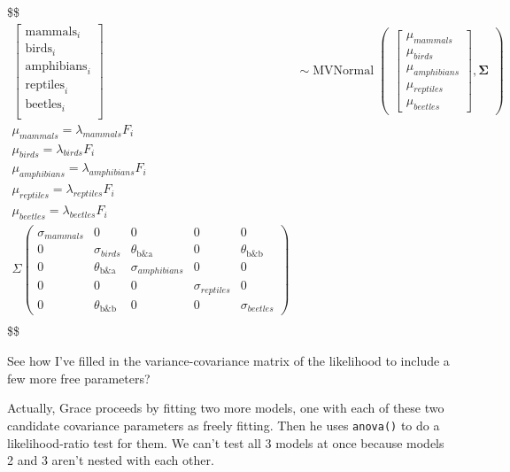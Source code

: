 \documentclass[
  letterpaper,
  DIV=11,
  numbers=noendperiod]{scrreprt}
\begin{document}
\$\$ \begin{align*}
\begin{bmatrix} \text{mammals}_i \\ \text{birds}_i \\ \text{amphibians}_i \\ \text{reptiles}_i \\ \text{beetles}_i \\ \end{bmatrix} & \sim
\operatorname{MVNormal} \begin{pmatrix} \begin{bmatrix} \mu_{mammals} \\ \mu_{birds} \\ \mu_{amphibians} \\ \mu_{reptiles} \\ \mu_{beetles} \end{bmatrix}, \mathbf \Sigma\end{pmatrix}\\

\mu_{mammals} = \lambda_{mammals} F_i \\
\mu_{birds} = \lambda_{birds} F_i \\
\mu_{amphibians} = \lambda_{amphibians} F_i \\
\mu_{reptiles} = \lambda_{reptiles} F_i \\
\mu_{beetles} = \lambda_{beetles} F_i \\

\Sigma \begin{pmatrix} 
\sigma_{mammals}&0 &0 &0 &0 \\ 
0 & \sigma_{birds} &\theta_\text{b&a} &0 &\theta_\text{b&b} \\ 
0 &\theta_\text{b&a} & \sigma_{amphibians} &0 &0 \\ 
0 & 0 & 0 & \sigma_{reptiles} &0 \\ 
0 &\theta_\text{b&b} & 0 & 0 & \sigma_{beetles} 
\end{pmatrix} \\
\end{align*} \$\$

See how I've filled in the variance-covariance matrix of the likelihood
to include a few more free parameters?

Actually, Grace proceeds by fitting two more models, one with each of
these two candidate covariance parameters as freely fitting. Then he
uses \texttt{anova()} to do a likelihood-ratio test for them. We can't
test all 3 models at once because models 2 and 3 aren't nested with each
other.
\end{document}
